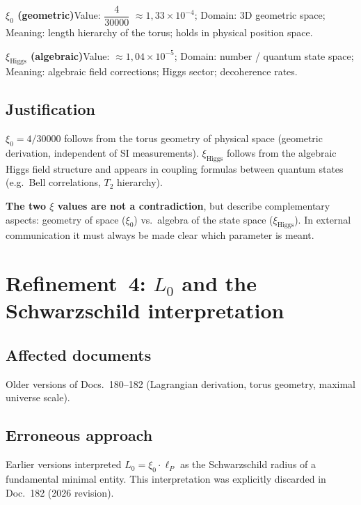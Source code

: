 \smallskip\noindent \textbf{$\xi_0$ (geometric)}\quad Value: $\dfrac{4}{30000}$ $\approx 1{,}33 \times 10^{-4}$; Domain: 3D geometric space; Meaning: length hierarchy of the torus; holds in physical position space.

\smallskip\noindent \textbf{$\xi_{\text{Higgs}}$ (algebraic)}\quad Value: $\approx 1{,}04 \times 10^{-5}$; Domain: number / quantum state space; Meaning: algebraic field corrections; Higgs sector; decoherence rates.

\medskip


\subsection*{Justification}

$\xi_0 = 4/30000$ follows from the torus geometry of physical space (geometric
derivation, independent of SI measurements). $\xi_{\text{Higgs}}$ follows from
the algebraic Higgs field structure and appears in coupling formulas between
quantum states (e.g.\ Bell correlations, $T_2$ hierarchy).

\textbf{The two $\xi$ values are not a contradiction}, but describe
complementary aspects: geometry of space ($\xi_0$) vs.\ algebra of the state
space ($\xi_{\text{Higgs}}$). In external communication it must always be made
clear which parameter is meant.

\section{\texorpdfstring{Refinement~4: $L_0$ and the Schwarzschild interpretation}{Refinement 4: L0 and the Schwarzschild interpretation}}

\subsection*{Affected documents}

Older versions of Docs.~180--182 (Lagrangian derivation, torus geometry,
maximal universe scale).

\subsection*{Erroneous approach}

Earlier versions interpreted $L_0 = \xi_0 \cdot \ell_P$ as the Schwarzschild
radius of a fundamental minimal entity. This interpretation was explicitly
discarded in Doc.~182 (2026 revision).

